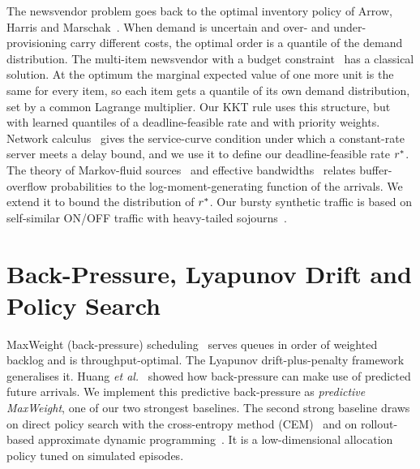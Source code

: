 The newsvendor problem goes back to the optimal inventory policy of Arrow, Harris and Marschak~\cite{arrow1951}. When demand is uncertain and over- and under-provisioning carry different costs, the optimal order is a quantile of the demand distribution. The multi-item newsvendor with a budget constraint~\cite{hadley1963} has a classical solution. At the optimum the marginal expected value of one more unit is the same for every item, so each item gets a quantile of its own demand distribution, set by a common Lagrange multiplier. Our KKT rule uses this structure, but with learned quantiles of a deadline-feasible rate and with priority weights. Network calculus~\cite{leboudec2001,chang1994} gives the service-curve condition under which a constant-rate server meets a delay bound, and we use it to define our deadline-feasible rate $r^{\ast}$. The theory of Markov-fluid sources~\cite{anick1982} and effective bandwidths~\cite{kesidis1993,kelly1996,duffield1994} relates buffer-overflow probabilities to the log-moment-generating function of the arrivals. We extend it to bound the distribution of $r^{\ast}$. Our bursty synthetic traffic is based on self-similar ON/OFF traffic with heavy-tailed sojourns~\cite{willinger1997}.

\section{Back-Pressure, Lyapunov Drift and Policy Search}
\label{sec:lit-bp}

MaxWeight (back-pressure) scheduling~\cite{tassiulas1992} serves queues in order of weighted backlog and is throughput-optimal. The Lyapunov drift-plus-penalty framework~\cite{neely2010} generalises it. Huang \emph{et al.}~\cite{huang2016} showed how back-pressure can make use of predicted future arrivals. We implement this predictive back-pressure as \emph{predictive MaxWeight}, one of our two strongest baselines. The second strong baseline draws on direct policy search with the cross-entropy method (CEM)~\cite{rubinstein1999} and on rollout-based approximate dynamic programming~\cite{bertsekas2020}. It is a low-dimensional allocation policy tuned on simulated episodes.

